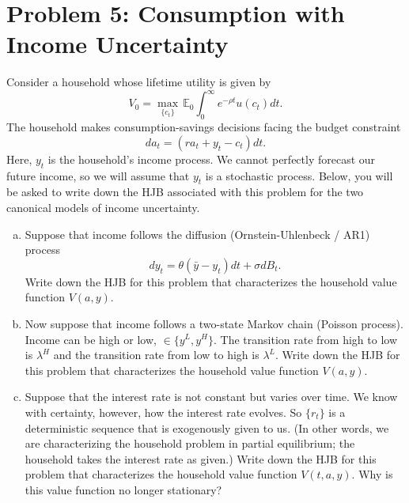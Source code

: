 \documentclass[11pt]{extarticle}
\theoremstyle{plain}
\theoremstyle{definition}
\begin{document}
\vspace{5mm}
\section*{Problem 5: Consumption with Income Uncertainty}

Consider a household whose lifetime utility is given by 
\begin{equation*}
	V_0 = \max_{ \{c_t\} } \, \mathbb E_0 \int_0^\infty e^{- \rho t} u(c_t) dt.
\end{equation*}
The household makes consumption-savings decisions facing the budget constraint 
\begin{equation*}
	da_t = (r a_t + y_t - c_t)dt.
\end{equation*}
Here, $y_t$ is the household's income process. We cannot perfectly forecast our future income, so we will assume that $y_t$ is a stochastic process. Below, you will be asked to write down the HJB associated with this problem for the two canonical models of income uncertainty.

\vspace{4mm}
\begin{enumerate}[(a)]
\item Suppose that income follows the diffusion (Ornstein-Uhlenbeck / AR1) process
\begin{equation*}
	dy_t = \theta(\bar y - y_t) dt + \sigma dB_t.
\end{equation*}
Write down the HJB for this problem that characterizes the household value function $V(a, y)$. 

\item Now suppose that income follows a two-state Markov chain (Poisson process). Income can be high or low, $\in \{y^L, y^H\}$. The transition rate from high to low is $\lambda^H$ and the transition rate from low to high is $\lambda^L$. Write down the HJB for this problem that characterizes the household value function $V(a, y)$. 

\item Suppose that the interest rate is not constant but varies over time. We know with certainty, however, how the interest rate evolves. So $\{r_t\}$ is a deterministic sequence that is exogenously given to us. (In other words, we are characterizing the household problem in partial equilibrium; the household takes the interest rate as given.) Write down the HJB for this problem that characterizes the household value function $V(t, a, y)$. Why is this value function no longer stationary?

\end{enumerate}
\end{document}
